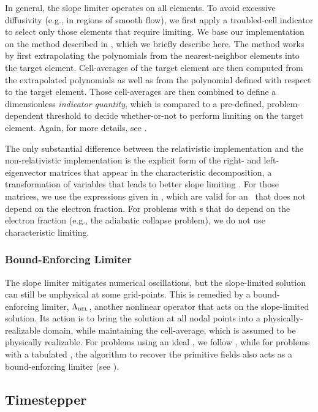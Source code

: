 In general, the slope limiter operates on all elements.
To avoid excessive diffusivity (e.g., in regions of smooth flow),
we first apply a troubled-cell indicator to select only
those elements that require limiting.
We base our implementation on the method described in \citet{fs2017},
which we briefly describe here.
The method works by first extrapolating the polynomials from the
nearest-neighbor elements into the target element.
Cell-averages of the target element are then computed from the
extrapolated polynomials as well as from the polynomial defined
with respect to the target element.
Those cell-averages are then combined to define a dimensionless
\emph{indicator quantity}, which is compared to a pre-defined,
problem-dependent threshold to decide whether-or-not to perform limiting on
the target element.
Again, for more details, see \citet{pbe2021}.

The only substantial difference between the relativistic implementation
and the non-relativistic implementation is the
explicit form of the right- and left-eigenvector matrices that appear in the
characteristic decomposition, a transformation of variables that leads to
better slope limiting \citep{cs1998}.
For those matrices, we use the expressions given in \citet{rz2013}, which are
valid for an \eos\ that does not depend on the electron fraction.
For problems with \eos s that do depend on the electron fraction
(e.g., the adiabatic collapse problem),
we do not use characteristic limiting.

\subsubsection{Bound-Enforcing Limiter}

The slope limiter mitigates numerical oscillations, but the slope-limited
solution can still be unphysical at some grid-points.
This is remedied by a bound-enforcing limiter, $\Lambda_{\textsc{bel}}$,
another nonlinear operator that acts on the slope-limited solution.
Its action is to bring the solution at all nodal
points into a physically-realizable domain, while
maintaining the cell-average, which is assumed to be physically realizable.
For problems using an ideal \eos, we follow \citet{qsy2016},
while for problems with a tabulated \eos, the algorithm to recover the
primitive fields also acts as a bound-enforcing limiter
(see ).

\subsection{Timestepper}

